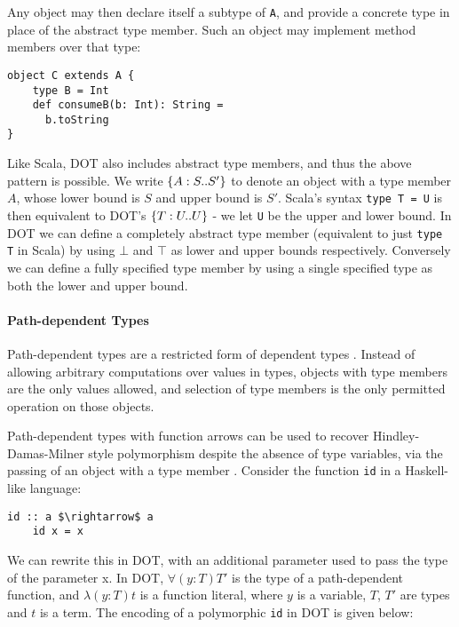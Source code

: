 \noindent Any object may then declare itself a subtype of \texttt{A}, and
provide a concrete type in place of the abstract type member. Such an object may
implement method members over that type:

\begin{minipage}{\linewidth}
\begin{lstlisting}[mathescape]
object C extends A {
    type B = Int
    def consumeB(b: Int): String =
      b.toString
}
\end{lstlisting}
\end{minipage}

\noindent Like Scala, DOT also includes abstract type members, and thus the
above pattern is possible. We write $\{A : S .. S'\}$ to denote an object with a
type member $A$, whose lower bound is $S$ and upper bound is $S'$. Scala's
syntax \texttt{type T = U} is then equivalent to DOT's $\{T : U .. U\}$ - we let
\texttt{U} be the upper and lower bound. In DOT we can define a completely
abstract type member (equivalent to just \texttt{type T} in Scala) by using
$\bot$ and $\top$ as lower and upper bounds respectively. Conversely we can
define a fully specified type member by using a single specified type as both
the lower and upper bound.

\paragraph{Path-dependent Types}
Path-dependent types are a restricted form of dependent types \cite{AGORS16}.
Instead of allowing arbitrary computations over values in types, objects with
type members are the only values allowed, and selection of type members is the
only permitted operation on those objects.

Path-dependent types with function arrows can be used to recover
Hindley-Damas-Milner style polymorphism despite the absence of type variables,
via the passing of an object with a type member \cite{AGORS16}. Consider the
function \texttt{id} in a Haskell-like language:

\begin{minipage}{\linewidth}
\begin{lstlisting}[mathescape]
    id :: a $\rightarrow$ a
    id x = x
\end{lstlisting}
\end{minipage}

We can rewrite this in DOT, with an additional parameter used to pass
the type of the parameter x. In DOT, $\forall(y: T)T'$ is the type of a
path-dependent function, and $\lambda(y: T)t$ is a function literal, where $y$
is a variable, $T$, $T'$ are types and $t$ is a term. The encoding of a
polymorphic \texttt{id} in DOT is given below:

